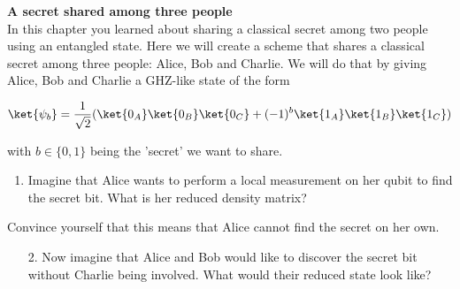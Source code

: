 \begin{exercises}
\item {\bf A secret shared among three people}\\
In this chapter you learned about sharing a classical secret among two people using an entangled state. Here we will create a scheme that shares a classical secret among three people: Alice, Bob and Charlie. We will do that by giving Alice, Bob and Charlie a GHZ-like state of the form

\[\ket{\psi_b} = \frac{1}{\sqrt{2}}(\ket{0_A}\ket{0_B}\ket{0_C}+ (-1)^b\ket{1_A}\ket{1_B}\ket{1_C})\]

with \(b\in \{0,1\}\) being the 'secret' we want to share.
\begin{enumerate}
\item Imagine that Alice wants to perform a local measurement on her qubit to find the secret bit. What is her reduced density matrix?
%
\end{enumerate}
Convince yourself that this means that Alice cannot find the secret on her own.
\begin{enumerate}
\item[2.] Now imagine that Alice and Bob would like to discover the secret bit without Charlie being involved. What would their reduced state look like?

\end{enumerate}
\end{exercises}
